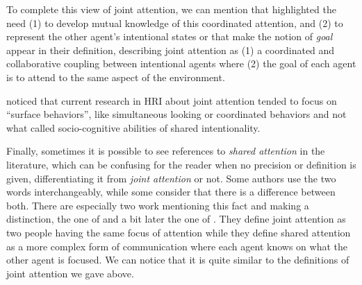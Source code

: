 \documentclass[a4paper,11pt,twoside]{StyleThese}
\begin{document}
To complete this view of joint attention, we can mention \cite{carpenter_2011_joint} that highlighted the need (1) to develop mutual knowledge of this coordinated attention, and (2) to represent the other agent’s intentional states or \cite{kaplan_2006_challenges} that make the notion of \emph{goal} appear in their definition, describing joint attention as (1) a coordinated and collaborative coupling between intentional agents where (2) the goal of each agent is to attend to the same aspect of the environment.

\cite{kaplan_2006_challenges} noticed that current research in HRI about joint attention tended to focus on ``surface behaviors'', like simultaneous looking or coordinated behaviors and not what \cite{tomasello_2007_shared} called socio-cognitive abilities of shared intentionality.

Finally, sometimes it is possible to see references to \emph{shared attention} in the literature, which can be confusing for the reader when no precision or definition is given, differentiating it from \emph{joint attention} or not. Some authors use the two words interchangeably, while some consider that there is a difference between both. There are especially two work mentioning this fact and making a distinction, the one of \cite{emery_2000_eyes} and a bit later the one of \cite{triesch_2006_gaze}. They define joint attention as two people having the same focus of attention while they define shared attention as a more complex form of communication where each agent knows on what the other agent is focused. We can notice that it is quite similar to the definitions of joint attention we gave above.
\end{document}
